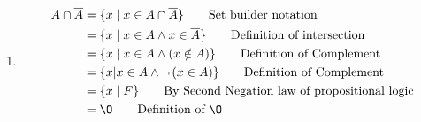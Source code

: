 \documentclass[12pt letter]{report}
\begin{document}
{\begin{enumerate}
\begin{align*}
                                & = U \tag*{Definition of Universal set}                                                     \\
          \end{align*}
    \item
          \begin{align*}
            A \cap \overline{A} & = \{ x  \mid x \in A \cap \overline{A}\} \tag*{Set builder notation}                     \\
                                & = \{x  \mid x \in A \wedge x \in \overline{A} \} \tag*{Definition of intersection}       \\
                                & = \{x  \mid x \in A \wedge \left( x \notin A \right)  \} \tag*{Definition of Complement} \\
                                & = \{x | x \in A \wedge  \neg \left( x \in  A \right) \} \tag*{Definition of
            Complement}                                                                                                    \\
                                & = \{x  \mid F\} \tag*{By Second Negation law of propositional logic}                     \\
                                & = \O \tag*{Definition of $\O$}                                                           \\
          \end{align*}
  \end{enumerate}
}

\end{document}
